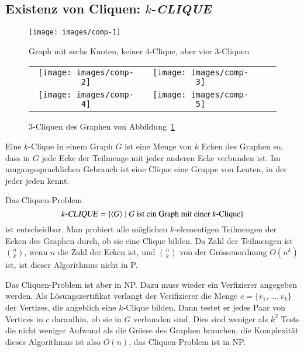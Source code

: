 \subsection{Existenz von Cliquen: \texorpdfstring{$k$}{k}-\textsl{CLIQUE}}
\begin{figure}
\begin{center}
\texttt{[image: images/comp-1]}
\end{center}
\caption{Graph mit sechs Knoten, keiner 4-Clique, aber
vier 3-Cliquen\label{6graph}}
\end{figure}%
\begin{figure}
\begin{center}
\begin{tabular}{cccc}
\texttt{[image: images/comp-2]}&%
\texttt{[image: images/comp-3]}\\
\texttt{[image: images/comp-4]}&%
\texttt{[image: images/comp-5]}
\end{tabular}
\end{center}
\caption{3-Cliquen des Graphen von Abbildung~\ref{6graph}}
\end{figure}%
Eine $k$-Clique in einem Graph $G$ ist eine Menge von $k$
Ecken des Graphen so, dass in $G$ jede Ecke der Teilmenge mit
jeder anderen Ecke verbunden ist. Im umgangssprachlichen Gebrauch
ist eine Clique eine Gruppe von Leuten, in der jeder jeden kennt.

Das Cliquen-Problem
\[
\text{$k$-\textsl{CLIQUE}} = \{ \langle G\rangle\;|\;
\text{$G$ ist ein Graph mit einer $k$-Clique}\}
\]
ist entscheidbar. Man probiert alle möglichen $k$-elementigen
Teilmengen der Ecken des Graphen durch, ob sie eine Clique
bilden. Da Zahl der Teilmengen ist $\binom{n}{k}$, wenn $n$
die Zahl der Ecken ist, und $\binom{n}{k}$ von der Grössenordnung
$O(n^k)$ ist, ist dieser Algorithmus nicht in P.

Das Cliquen-Problem ist aber in NP. Dazu muss wieder ein
Verfizierer angegeben werden. Als Lösungszertifikat verlangt
der Verifizierer die Menge $c=\{v_1,\dots,v_k\}$ der
Vertizes, die angeblich eine $k$-Clique bilden. Dann testet
er jedes Paar von Vertices in $c$ daraufhin, ob sie in $G$
verbunden sind. Dies sind weniger als $k^2$ Tests die nicht
weniger Aufwand als die Grösse des Graphen brauchen, die
Komplexität dieses Algorithmus ist also $O(n)$, das
Cliquen-Problem ist in NP.

